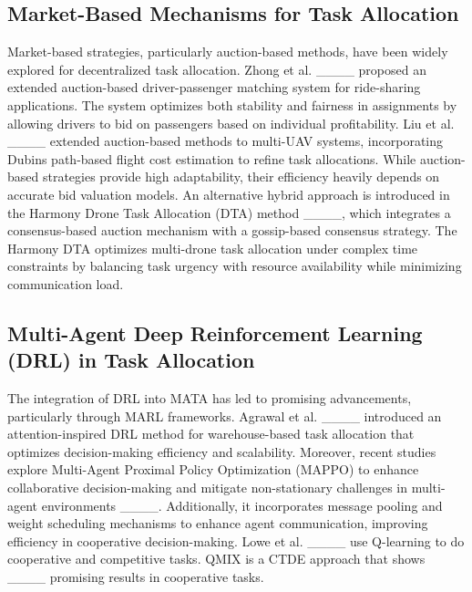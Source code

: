 \subsection{Market-Based Mechanisms for Task Allocation}
Market-based strategies, particularly auction-based methods, have been widely explored for decentralized task allocation. Zhong et al. ____ proposed an extended auction-based driver-passenger matching system for ride-sharing applications. The system optimizes both stability and fairness in assignments by allowing drivers to bid on passengers based on individual profitability. Liu et al. ____ extended auction-based methods to multi-UAV systems, incorporating Dubins path-based flight cost estimation to refine task allocations. While auction-based strategies provide high adaptability, their efficiency heavily depends on accurate bid valuation models. An alternative hybrid approach is introduced in the Harmony Drone Task Allocation (DTA) method ____, which integrates a consensus-based auction mechanism with a gossip-based consensus strategy. The Harmony DTA optimizes multi-drone task allocation under complex time constraints by balancing task urgency with resource availability while minimizing communication load.

\subsection{Multi-Agent Deep Reinforcement Learning (DRL) in Task Allocation}

The integration of DRL into MATA has led to promising advancements, particularly through MARL frameworks. Agrawal et al. ____ introduced an attention-inspired DRL method for warehouse-based task allocation that optimizes decision-making efficiency and scalability. Moreover, recent studies explore Multi-Agent Proximal Policy Optimization (MAPPO) to enhance collaborative decision-making and mitigate non-stationary challenges in multi-agent environments ____. Additionally, it incorporates message pooling and weight scheduling mechanisms to enhance agent communication, improving efficiency in cooperative decision-making. Lowe et al. ____ use Q-learning to do cooperative and competitive tasks. QMIX is a CTDE approach that shows ____ promising results in cooperative tasks.


